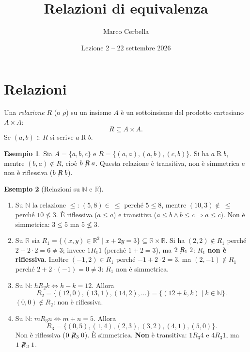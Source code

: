 \documentclass[11pt,a4paper]{article}
\title{Relazioni di equivalenza}
\author{Marco Cerbella}
\date{Lezione 2 -- 22 settembre 2026}
\theoremstyle{definition}
\newtheorem*{esempio}{Esempio}
\begin{document}
\maketitle

\section{Relazioni}

\begin{definizione}
Una \emph{relazione} $R$ (o $\rho$) su un insieme $A$ è un sottoinsieme del
prodotto cartesiano $A \times A$:
\[
R \subseteq A \times A.
\]
Se $(a, b) \in R$ si scrive $a \mathrel{R} b$.
\end{definizione}

\begin{esempio}
Sia $A = \{a, b, c\}$ e $R = \{(a,a), (a,b), (c,b)\}$. Si ha
$a \mathrel{R} b$, mentre $(b, a) \notin R$, cioè $b \not\mathrel{R} a$.
Questa relazione è transitiva, non è simmetrica e non è riflessiva
($b \not\mathrel{R} b$).
\end{esempio}

\begin{esempio}[Relazioni su $\mathbb{N}$ e $\mathbb{R}$]
\leavevmode
\begin{enumerate}
    \item Su $\mathbb{N}$ la relazione $\leq$: $(5, 8) \in\ \leq$ perché
          $5 \leq 8$, mentre $(10, 3) \notin\ \leq$ perché $10 \nleq 3$.
          È riflessiva ($a \leq a$) e transitiva
          ($a \leq b \land b \leq c \Rightarrow a \leq c$). Non è
          simmetrica: $3 \leq 5$ ma $5 \nleq 3$.

    \item Su $\mathbb{R}$ sia
          $R_1 = \{(x, y) \in \mathbb{R}^2 \mid x + 2y = 3\}
          \subseteq \mathbb{R} \times \mathbb{R}$.
          Si ha $(2, 2) \notin R_1$ perché $2 + 2 \cdot 2 = 6 \neq 3$;
          invece $1 \mathrel{R_1} 1$ (perché $1 + 2 = 3$), ma
          $2 \not\mathrel{R_1} 2$: $R_1$ \textbf{non è riflessiva}.
          Inoltre $(-1, 2) \in R_1$ perché $-1 + 2 \cdot 2 = 3$, ma
          $(2, -1) \notin R_1$ perché $2 + 2 \cdot (-1) = 0 \neq 3$:
          $R_1$ non è simmetrica.

    \item Su $\mathbb{N}$: $h \mathrel{R_2} k \iff h - k = 12$. Allora
          \[
          R_2 = \{(12, 0), (13, 1), (14, 2), \dots\}
              = \{(12 + k, k) \mid k \in \mathbb{N}\}.
          \]
          $(0, 0) \notin R_2$: non è riflessiva.

    \item Su $\mathbb{N}$: $m \mathrel{R_3} n \iff m + n = 5$. Allora
          \[
          R_3 = \{(0,5), (1,4), (2,3), (3,2), (4,1), (5,0)\}.
          \]
          Non è riflessiva ($0 \not\mathrel{R_3} 0$). È simmetrica.
          \textbf{Non} è transitiva: $1 \mathrel{R_3} 4$ e
          $4 \mathrel{R_3} 1$, ma $1 \not\mathrel{R_3} 1$.
\end{enumerate}
\end{esempio}
\end{document}

